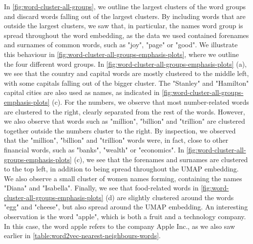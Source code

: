 In \cref{fig:word-cluster-all-groups}, we outline the largest clusters of the word groups and discard words falling out of the largest clusters. By including words that are outside the largest clusters, we saw that, in particular, the names word group is spread throughout the word embedding, as the data we used contained forenames and surnames of common words, such as "joy", "page" or "good". We illustrate this behaviour in \cref{fig:word-cluster-all-groups-emphasis-plots}, where we outline the four different word groups. In \cref{fig:word-cluster-all-groups-emphasis-plots} (a), we see that the country and capital words are mostly clustered to the middle left, with some capitals falling out of the bigger cluster. The "Stanley" and "Hamilton" capital cities are also used as names, as indicated in \cref{fig:word-cluster-all-groups-emphasis-plots} (c). For the numbers, we observe that most number-related words are clustered to the right, clearly separated from the rest of the words. However, we also observe that words such as "million", "billion" and "trillion" are clustered together outside the numbers cluster to the right. By inspection, we observed that the "million", "billion" and "trillion" words were, in fact, close to other financial words, such as "banks", "wealth" or "economics". In \cref{fig:word-cluster-all-groups-emphasis-plots} (c), we see that the forenames and surnames are clustered to the top left, in addition to being spread throughout the UMAP embedding. We also observe a small cluster of women names forming, containing the names "Diana" and "Isabella". Finally, we see that food-related words in \cref{fig:word-cluster-all-groups-emphasis-plots} (d) are slightly clustered around the words "egg" and "cheese", but also spread around the UMAP embedding. An interesting observation is the word "apple", which is both a fruit and a technology company. In this case, the word apple refers to the company Apple Inc., as we also saw earlier in \cref{table:word2vec-nearest-neighbours-words}.
